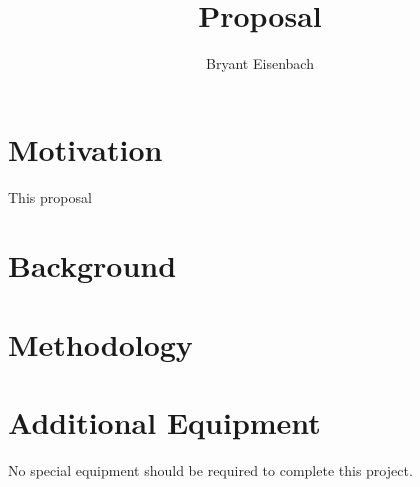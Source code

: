 \documentclass[titlepage]{article}
\author{Bryant Eisenbach}
\title{Proposal}
\begin{document}
\section{Motivation}
This proposal 


\section{Background}

\section{Methodology}

\section{Additional Equipment}
No special equipment should be required to complete this project.
\end{document}
